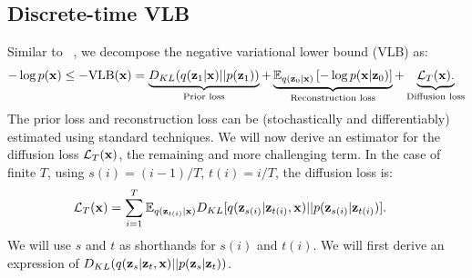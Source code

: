 \documentclass{article}
\newcommand{\lT}{\mathcal{L}_T(\rvx)}
\begin{document}
\subsection{Discrete-time VLB}
Similar to ~\citep{sohl2015deep}, we decompose the negative variational lower bound (VLB) as:
\begin{align}
    - \log p(\rvx) \leq %
    - \text{VLB}(\rvx) =
    \underbrace{%
    D_{KL}(q(\rvz_1|\rvx)||p(\rvz_1))
    }_{\text{Prior loss}}
    + \underbrace{%
    \E_{q(\rvz_0|\rvx)}\left[ - \log p(\rvx|\rvz_0) \right]
    }_{\text{Reconstruction loss}}
    +
    \underbrace{
    \lT.
    }_{\text{Diffusion loss}}
\end{align}
The prior loss and reconstruction loss can be (stochastically and differentiably) estimated using standard techniques. We will now derive an estimator for the diffusion loss $\lT$, the remaining and more challenging term. In the case of finite $T$, using $s(i) = (i-1)/T$, $t(i) = i/T$, the diffusion loss is:
\begin{align}
    \lT
    &= 
    \sum_{i=1}^T
    \E_{q(\rvz_{t(i)}|\rvx)} 
    D_{KL}[q(\rvz_{s(i)}|\rvz_{t(i)},\rvx)||p(\rvz_{s(i)}|\rvz_{t(i)})].
\end{align}
We will use $s$ and $t$ as shorthands for $s(i)$ and $t(i)$. We will first derive an expression of $D_{KL}(q({\mathbf{z}}_s|{\mathbf{z}}_t,{\mathbf{x}})||p({\mathbf{z}}_s|{\mathbf{z}}_t))$.
\end{document}
